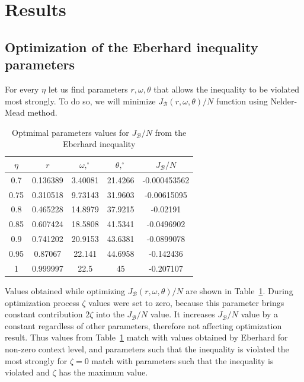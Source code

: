 \documentclass[%
master,         %
subf,           %
href,           %
colorlinks=true %
]{disser}
\numberwithin{equation}{section}
\numberwithin{figure}{section}
\begin{document}
\section{Results}
\subsection{Optimization of the Eberhard inequality parameters }
For every $\eta$ let us find parameters $r, \omega, \theta$ that allows the inequality to be violated most strongly.
To do so, we will minimize $J_{\mathcal{B}}(r, \omega, \theta) / N$ function using Nelder-Mead method.

\begin{table}[h]
\centering
\begin{tabular}{|c|c|c|c|c|}
\hline
$\eta$ & $r$ & $\omega,^\circ$ & $\theta,^\circ$ & $J_{\mathcal{B}} / N$
\\\hline
0.7 & 0.136389 & 3.40081 & 21.4266 & -0.000453562\\\hline
0.75 & 0.310518 & 9.73143 & 31.9603 & -0.00615095\\\hline
0.8 & 0.465228 & 14.8979 & 37.9215 & -0.02191\\\hline
0.85 & 0.607424 & 18.5808 & 41.5341 & -0.0496902\\\hline
0.9 & 0.741202 & 20.9153 & 43.6381 & -0.0899078\\\hline
0.95 & 0.87067 & 22.141 & 44.6958 & -0.142436\\\hline
1 & 0.999997 & 22.5 & 45 & -0.207107\\\hline
\end{tabular}
\caption{Optmimal parameters values for $J_{\mathcal{B}} / N$ from the Eberhard inequality}
\label{tab:Eberhard_repeat}
\end{table}

Values obtained while optimizing $J_{\mathcal{B}}(r, \omega, \theta) / N$ are shown in  
Table~\ref{tab:Eberhard_repeat}. During optimization process  $\zeta$ values were set to zero, 
because this parameter brings constant contribution $2\zeta$ into the $J_{\mathcal{B}} / N$ value. It increases $J_{\mathcal{B}} / N$ value by a constant regardless of other parameters, 
therefore not affecting optimization result. Thus values from Table~\ref{tab:Eberhard_repeat} 
match with values obtained by Eberhard \citep{Eberhard} for non-zero context level, and parameters such that the inequality is
violated the most strongly for $\zeta = 0$ match with parameters such that the inequality is
violated and $\zeta$ has the maximum value.
\end{document}
